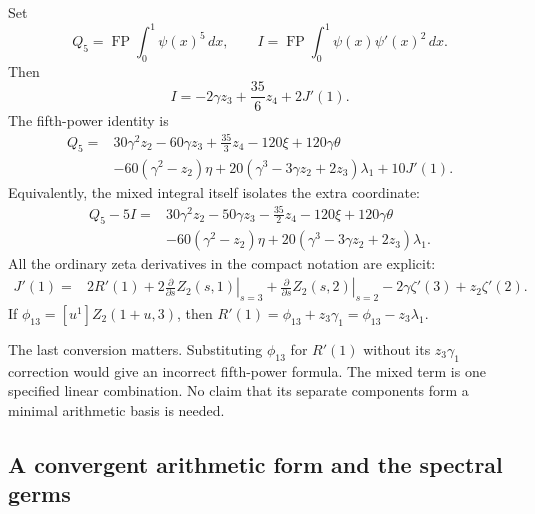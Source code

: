 \begin{theorem}
\label{q5:main}
Set
\[
 Q_5=\operatorname{FP}\int_0^1\psi(x)^5\,dx,
 \qquad
 I=\operatorname{FP}\int_0^1\psi(x)\psi'(x)^2\,dx.
\]
Then
\begin{equation}\label{q5:Ibridge}
 \boxed{\displaystyle
 I=-2\gamma z_3+\frac{35}{6}z_4+2J'(1).}
\end{equation}
The fifth-power identity is
\begin{equation}\label{q5:bridge}
 \boxed{\begin{aligned}
 Q_5={}&30\gamma^2z_2-60\gamma z_3+\frac{35}{3}z_4
       -120\xi+120\gamma\theta\\
 &-60(\gamma^2-z_2)\eta
       +20(\gamma^3-3\gamma z_2+2z_3)\lambda_1
       +10J'(1).
 \end{aligned}}
\end{equation}
Equivalently, the mixed integral itself isolates the extra coordinate:
\begin{equation}\label{q5:QminusI}
 \boxed{\begin{aligned}
 Q_5-5I={}&30\gamma^2z_2-50\gamma z_3-\frac{35}{2}z_4
       -120\xi+120\gamma\theta\\
 &-60(\gamma^2-z_2)\eta
       +20(\gamma^3-3\gamma z_2+2z_3)\lambda_1.
 \end{aligned}}
\end{equation}
All the ordinary zeta derivatives in the compact notation are explicit:
\begin{align}\label{q5:Jexpanded}
 J'(1)={}&2R'(1)
       +2\left.\frac{\partial}{\partial s}Z_2(s,1)\right|_{s=3}
       +\left.\frac{\partial}{\partial s}Z_2(s,2)\right|_{s=2}
       -2\gamma\zeta'(3)+z_2\zeta'(2).
\end{align}
If $\phi_{13}=[u^1]Z_2(1+u,3)$, then
$R'(1)=\phi_{13}+z_3\gamma_1=\phi_{13}-z_3\lambda_1$.
\end{theorem}

The last conversion matters.  Substituting $\phi_{13}$ for $R'(1)$
without its $z_3\gamma_1$ correction would give an incorrect fifth-power
formula.  The mixed term is one specified linear combination.  No claim
that its separate components form a minimal arithmetic basis is needed.

\subsection{A convergent arithmetic form and the spectral germs}

